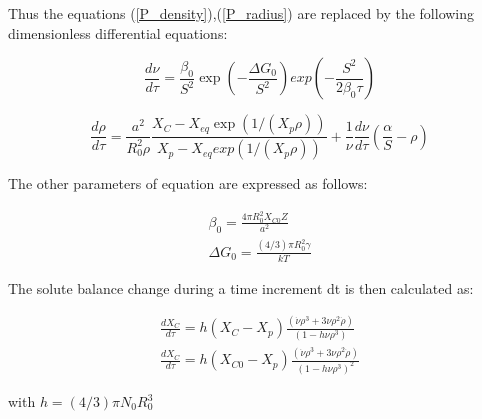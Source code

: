 \documentclass[12pt,a4paper]{article}
\begin{document}
Thus the equations (\ref{P_density}),(\ref{P_radius}) are replaced by the following dimensionless differential equations:

\begin{equation}
	\frac{d\nu}{d\tau} = \frac{\beta_0}{S^2} \exp(-\frac{\Delta G_0}{S^2}) exp(-\frac{S^2}{2\beta_0 \tau}) 
\end{equation}

\begin{equation}
	\frac{d\rho}{d\tau} = \frac{a^2}{R_0^2 \rho}\frac{X_C - X_{eq}\exp(1/(X_p\rho))}{X_p - X_{eq}exp(1/(X_p\rho))} + \frac{1}{\nu}\frac{d\nu}{d\tau}(\frac{\alpha}{S} - \rho) 
\end{equation}

The other parameters of equation are expressed as follows:

\begin{subequations}
	\begin{align}
\beta_0 = \frac{4\pi R_0^2 X_{C0}Z}{a^2} \\
\Delta G_0 = \frac{(4/3) \pi R_0^2 \gamma}{kT} 
	\end{align}	
\end{subequations}

The solute balance change during a time increment dt is then calculated as:

\begin{subequations}
	\begin{align}
\frac{dX_C}{d\tau} = h(X_C - X_p) \frac{(\dot{\nu}\rho^3 + 3\nu \rho^2 \dot{\rho})}{(1 - h \nu \rho^3)} \\ 
\frac{dX_C}{d\tau} = h(X_{C0} - X_p) \frac{(\dot{\nu}\rho^3 + 3\nu \rho^2 \dot{\rho})}{(1 - h \nu \rho^3)^2} 
	\end{align}
\end{subequations}

with $h = (4/3)\pi N_0R_0^3$

%
%
\end{document}
